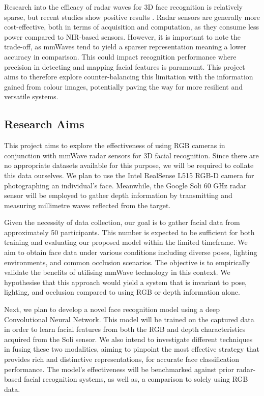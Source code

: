 \documentclass{mpaper}
\begin{document}
Research into the efficacy of radar waves for 3D face recognition is relatively sparse, but recent studies show positive results \cite{hof2020face, lim2020dnn,kim2020face, pho2021radar,challa2021face}. Radar sensors are generally more cost-effective, both in terms of acquisition and computation, as they consume less power compared to NIR-based sensors. However, it is important to note the trade-off, as mmWaves tend to yield a sparser representation meaning a lower accuracy in comparison. This could impact recognition performance where precision in detecting and mapping facial features is paramount. This project aims to therefore explore counter-balancing this limitation with the information gained from colour images, potentially paving the way for more resilient and versatile systems. 


\subsection{Research Aims}
This project aims to explore the effectiveness of using RGB cameras in conjunction with mmWave radar sensors for 3D facial recognition. Since there are no appropriate datasets available for this purpose, we will be required to collate this data ourselves. We plan to use the Intel RealSense L515 RGB-D camera \cite{intel-l515} for photographing an individual's face. Meanwhile, the Google Soli 60 GHz radar sensor \cite{lien2016soli} will be employed to gather depth information by transmitting and measuring millimetre waves reflected from the target.

Given the necessity of data collection, our goal is to gather facial data from approximately 50 participants. This number is expected to be sufficient for both training and evaluating our proposed model within the limited timeframe. We aim to obtain face data under various conditions including diverse poses, lighting environments, and common occlusion scenarios. The objective is to empirically validate the benefits of utilising mmWave technology in this context. We hypothesise that this approach would yield a system that is invariant to pose, lighting, and occlusion compared to using RGB or depth information alone.

Next, we plan to develop a novel face recognition model using a deep Convolutional Neural Network. This model will be trained on the captured data in order to learn facial features from both the RGB and depth characteristics acquired from the Soli sensor. We also intend to investigate different techniques in fusing these two modalities, aiming to pinpoint the most effective strategy that provides rich and distinctive representations, for accurate face classification performance. The model's effectiveness will be benchmarked against prior radar-based facial recognition systems, as well as, a comparison to solely using RGB data.
\end{document}
